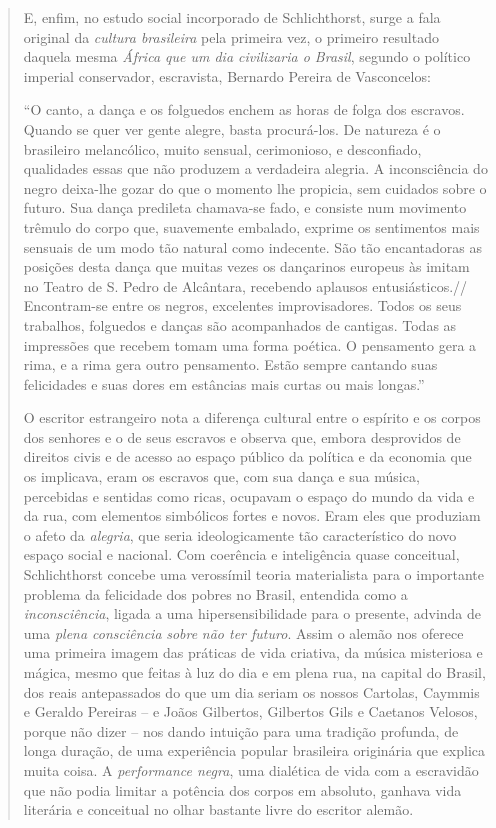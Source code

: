\begin{quote}
E, enfim, no estudo social incorporado de Schlichthorst, surge a fala
original da \emph{cultura brasileira} pela primeira vez, o primeiro
resultado daquela mesma \emph{África que um dia civilizaria o Brasil},
segundo o político imperial conservador, escravista, Bernardo Pereira de
Vasconcelos:

``O canto, a dança e os folguedos enchem as horas de folga dos escravos.
Quando se quer ver gente alegre, basta procurá-los. De natureza é o
brasileiro melancólico, muito sensual, cerimonioso, e desconfiado,
qualidades essas que não produzem a verdadeira alegria. A inconsciência
do negro deixa-lhe gozar do que o momento lhe propicia, sem cuidados
sobre o futuro. Sua dança predileta chamava-se fado, e consiste num
movimento trêmulo do corpo que, suavemente embalado, exprime os
sentimentos mais sensuais de um modo tão natural como indecente. São tão
encantadoras as posições desta dança que muitas vezes os dançarinos
europeus às imitam no Teatro de S. Pedro de Alcântara, recebendo
aplausos entusiásticos.// Encontram-se entre os negros, excelentes
improvisadores. Todos os seus trabalhos, folguedos e danças são
acompanhados de cantigas. Todas as impressões que recebem tomam uma
forma poética. O pensamento gera a rima, e a rima gera outro pensamento.
Estão sempre cantando suas felicidades e suas dores em estâncias mais
curtas ou mais longas.''

O escritor estrangeiro nota a diferença cultural entre o espírito e os
corpos dos senhores e o de seus escravos e observa que, embora
desprovidos de direitos civis e de acesso ao espaço público da política
e da economia que os implicava, eram os escravos que, com sua dança e
sua música, percebidas e sentidas como ricas, ocupavam o espaço do mundo
da vida e da rua, com elementos simbólicos fortes e novos. Eram eles que
produziam o afeto da \emph{alegria}, que seria ideologicamente tão
característico do novo espaço social e nacional. Com coerência e
inteligência quase conceitual, Schlichthorst concebe uma verossímil
teoria materialista para o importante problema da felicidade dos pobres
no Brasil, entendida como a \emph{inconsciência}, ligada a uma
hipersensibilidade para o presente, advinda de uma \emph{plena
consciência} \emph{sobre} \emph{não ter futuro}. Assim o alemão nos
oferece uma primeira imagem das práticas de vida criativa, da música
misteriosa e mágica, mesmo que feitas à luz do dia e em plena rua, na
capital do Brasil, dos reais antepassados do que um dia seriam os nossos
Cartolas, Caymmis e Geraldo Pereiras -- e Joãos Gilbertos, Gilbertos
Gils e Caetanos Velosos, porque não dizer -- nos dando intuição para uma
tradição profunda, de longa duração, de uma experiência popular
brasileira originária que explica muita coisa. A \emph{performance
negra}, uma dialética de vida com a escravidão que não podia limitar a
potência dos corpos em absoluto, ganhava vida literária e conceitual no
olhar bastante livre do escritor alemão.


\end{quote}
